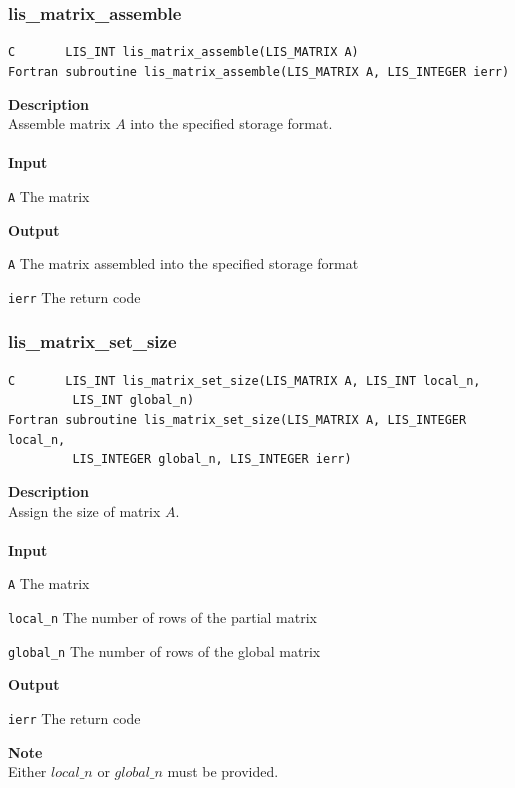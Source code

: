 \documentclass[a4paper]{article}
\newcommand{\namelistlabel}[1]{\mbox{#1}\hfill}
\newenvironment{namelist}[1]{%
\begin{list}{}
  {\let\makelabel\namelistlabel
  \settowidth{\labelwidth}{#1}
  \setlength{\leftmargin}{1.1\labelwidth}}
  }{%
\end{list}}
\begin{document}
\subsubsection{lis\_matrix\_assemble}
\begin{screen}
\verb|C       LIS_INT lis_matrix_assemble(LIS_MATRIX A)|\\
\verb|Fortran subroutine lis_matrix_assemble(LIS_MATRIX A, LIS_INTEGER ierr)|
\end{screen}
{\bf Description}\\
\indent
Assemble matrix $A$ into the specified storage format.
\\ \\
\noindent
{\bf Input}
\begin{namelist}{XXXXXXXXXXXXXXXXXXXX}
\item[\tt A] The matrix
\end{namelist}
{\bf Output}
\begin{namelist}{XXXXXXXXXXXXXXXXXXXX}
\item[\tt A] The matrix assembled into the specified storage format
\item[\tt ierr] The return code
\end{namelist}

\subsubsection{lis\_matrix\_set\_size}
\begin{screen}
\verb|C       LIS_INT lis_matrix_set_size(LIS_MATRIX A, LIS_INT local_n,|\\
\verb|         LIS_INT global_n)|\\
\verb|Fortran subroutine lis_matrix_set_size(LIS_MATRIX A, LIS_INTEGER local_n,|\\
\verb|         LIS_INTEGER global_n, LIS_INTEGER ierr)|
\end{screen}
{\bf Description}\\
\indent
Assign the size of matrix $A$.
\\ \\
\noindent
{\bf Input}
\begin{namelist}{XXXXXXXXXXXXXXXXXXXX}
\item[\tt A] The matrix
\item[\tt local\_n] The number of rows of the partial matrix
\item[\tt global\_n] The number of rows of the global matrix
\end{namelist}
{\bf Output}
\begin{namelist}{XXXXXXXXXXXXXXXXXXXX}
\item[\tt ierr] The return code
\end{namelist}
{\bf Note}\\
\indent
Either $local\_n$ or $global\_n$ must be provided. 
\end{document}
